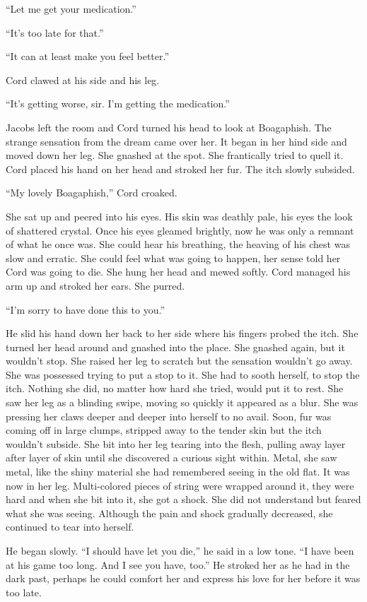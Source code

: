 \documentclass[
]{article}
\begin{document}
``Let me get your medication.''

``It's too late for that.''

``It can at least make you feel better.''

Cord clawed at his side and his leg.

``It's getting worse, sir. I'm getting the medication.''

Jacobs left the room and Cord turned his head to look at Boagaphish. The
strange sensation from the dream came over her. It began in her hind
side and moved down her leg. She gnashed at the spot. She frantically
tried to quell it. Cord placed his hand on her head and stroked her fur.
The itch slowly subsided.

``My lovely Boagaphish,'' Cord croaked.

She sat up and peered into his eyes. His skin was deathly pale, his eyes
the look of shattered crystal. Once his eyes gleamed brightly, now he
was only a remnant of what he once was. She could hear his breathing,
the heaving of his chest was slow and erratic. She could feel what was
going to happen, her sense told her Cord was going to die. She hung her
head and mewed softly. Cord managed his arm up and stroked her ears. She
purred.

``I'm sorry to have done this to you.''

He slid his hand down her back to her side where his fingers probed the
itch. She turned her head around and gnashed into the place. She gnashed
again, but it wouldn't stop. She raised her leg to scratch but the
sensation wouldn't go away. She was possessed trying to put a stop to
it. She had to sooth herself, to stop the itch. Nothing she did, no
matter how hard she tried, would put it to rest. She saw her leg as a
blinding swipe, moving so quickly it appeared as a blur. She was
pressing her claws deeper and deeper into herself to no avail. Soon, fur
was coming off in large clumps, stripped away to the tender skin but the
itch wouldn't subside. She bit into her leg tearing into the flesh,
pulling away layer after layer of skin until she discovered a curious
sight within. Metal, she saw metal, like the shiny material she had
remembered seeing in the old flat. It was now in her leg. Multi-colored
pieces of string were wrapped around it, they were hard and when she bit
into it, she got a shock. She did not understand but feared what she was
seeing. Although the pain and shock gradually decreased, she continued
to tear into herself.

He began slowly. ``I should have let you die,'' he said in a low tone.
``I have been at his game too long. And I see you have, too.'' He
stroked her as he had in the dark past, perhaps he could comfort her and
express his love for her before it was too late.
\end{document}
